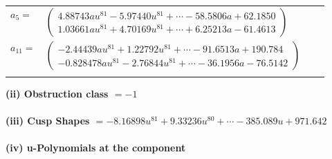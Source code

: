 \documentclass[1p]{elsarticle_modified}
\theoremstyle{definition}
\begin{document}
\begin{tabular}{m{7pt} m{180pt} m{7pt} m{180pt} }
\flushright $a_{5}=$&$\begin{pmatrix}4.88743 a u^{81}-5.97440 u^{81}+\cdots-58.5806 a+62.1850\\1.03661 a u^{81}+4.70169 u^{81}+\cdots+6.25213 a-61.4613\end{pmatrix}$ \\
\flushright $a_{11}=$&$\begin{pmatrix}-2.44439 a u^{81}+1.22792 u^{81}+\cdots-91.6513 a+190.784\\-0.828478 a u^{81}-2.76844 u^{81}+\cdots-36.1956 a-76.5142\end{pmatrix}$\\&\end{tabular}
\flushleft \textbf{(ii) Obstruction class $= -1$}\\~\\
\flushleft \textbf{(iii) Cusp Shapes $= -8.16898 u^{81}+9.33236 u^{80}+\cdots-385.089 u+971.642$}\\~\\
\newpage\renewcommand{\arraystretch}{1}
\flushleft \textbf{(iv) u-Polynomials at the component}\newline \\
\end{document}
